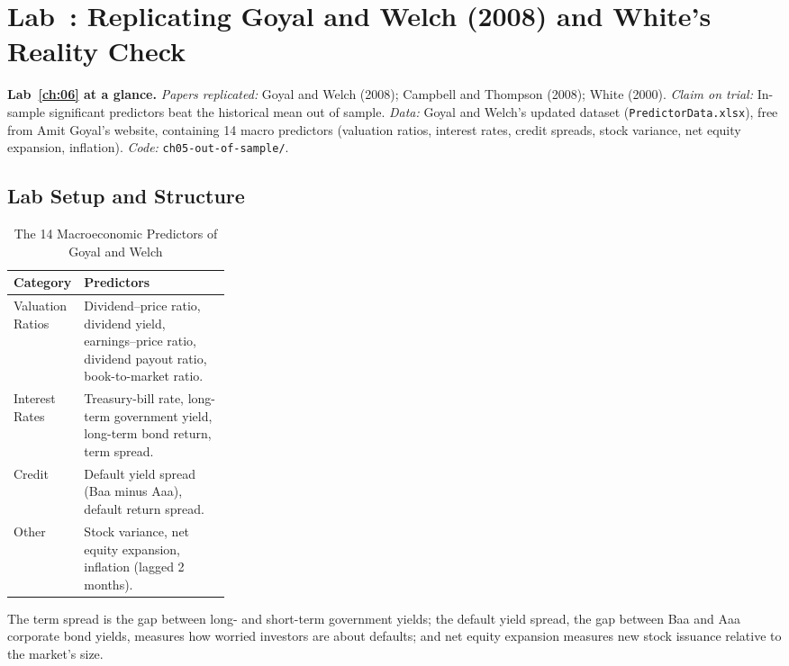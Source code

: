\section{Lab~\thechapter: Replicating Goyal and Welch (2008) and White's Reality Check}
\label{sec:09-lab}

\begin{callout}
\textbf{Lab~\ref{ch:06} at a glance.} \emph{Papers replicated:} Goyal and Welch (2008); Campbell and Thompson (2008); White (2000). \emph{Claim on trial:} In-sample significant predictors beat the historical mean out of sample. \emph{Data:} Goyal and Welch's updated dataset (\texttt{PredictorData.xlsx}), free from Amit Goyal's website, containing 14 macro predictors (valuation ratios, interest rates, credit spreads, stock variance, net equity expansion, inflation). \emph{Code:} \texttt{ch05-out-of-sample/}.
\end{callout}

\subsection*{Lab Setup and Structure}
\begin{table}[htbp]
\centering
\small
\caption{The 14 Macroeconomic Predictors of Goyal and Welch}
\label{tab:09-goyal-predictors}
\begin{tabularx}{0.95\linewidth}{@{}>{\raggedright\arraybackslash}p{0.28\linewidth}>{\raggedright\arraybackslash}X@{}}
\toprule
Category & Predictors \\
\midrule
Valuation Ratios & Dividend--price ratio, dividend yield, earnings--price ratio, dividend payout ratio, book-to-market ratio. \\
Interest Rates & Treasury-bill rate, long-term government yield, long-term bond return, term spread. \\
Credit & Default yield spread (Baa minus Aaa), default return spread. \\
Other & Stock variance, net equity expansion, inflation (lagged 2 months). \\
\bottomrule
\end{tabularx}
\end{table}

The term spread is the gap between long- and short-term government yields; the default yield spread, the gap between Baa and Aaa corporate bond yields, measures how worried investors are about defaults; and net equity expansion measures new stock issuance relative to the market's size.

